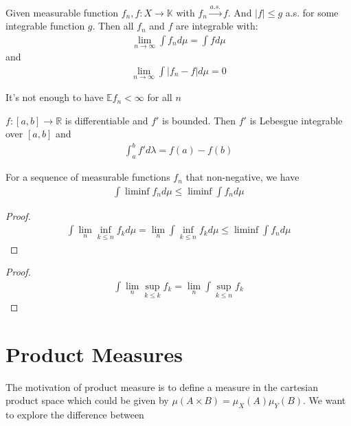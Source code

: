 \begin{theorem}
	Given measurable function $f_n, f : X \rightarrow \mathbb{K}$ with $f_n \overset{a.s.}{\rightarrow} f$. And $|f| \leq g$ a.s.  for some integrable function $g$. Then all $f_n$ and $f$ are integrable with:
	\begin{align*}
		\lim_{n \rightarrow \infty} \int f_n d\mu = \int f d\mu
	\end{align*}
	and 
	\begin{align*}
		\lim_{n \rightarrow \infty} \int |f_n - f| d\mu = 0
	\end{align*}
\end{theorem}
\begin{remark}
It's not enough to have $\mathbb{E}f_n < \infty$ for all $n$	
\end{remark}

\begin{example}
	$f:[a, b] \rightarrow \mathbb{R}$ is differentiable and $f'$ is bounded. Then $f'$ is Lebesgue integrable over $[a, b]$ and 
	\begin{align*}
		\int_a^b f'd\lambda = f(a) - f(b)
	\end{align*}
\end{example}

\begin{theorem}
	For a sequence of measurable functions $f_n$ that non-negative, we have
	\begin{align*}
		\int \liminf f_n d\mu \le \liminf \int f_n d\mu 
	\end{align*}
\end{theorem}
\begin{proof}
\begin{align*}
	\int \lim_n \inf_{k \le n} f_k d\mu = \lim_n \int \inf_{k \le n} f_k d\mu \le \liminf \int f_n d\mu 
\end{align*}
\end{proof}

\begin{corollary}
	
\end{corollary}
\begin{proof}
\begin{align*}
	\int \lim_n \sup_{k \le k} f_k  = \lim_n \int \sup_{k \le n}f_k 
\end{align*}
\end{proof}



\newpage
\section{Product Measures}
The motivation of product measure is to define a measure in the cartesian product space which could be given by $\mu(A \times B) = \mu_X(A) \mu_Y(B)$. We want to explore the difference between 


